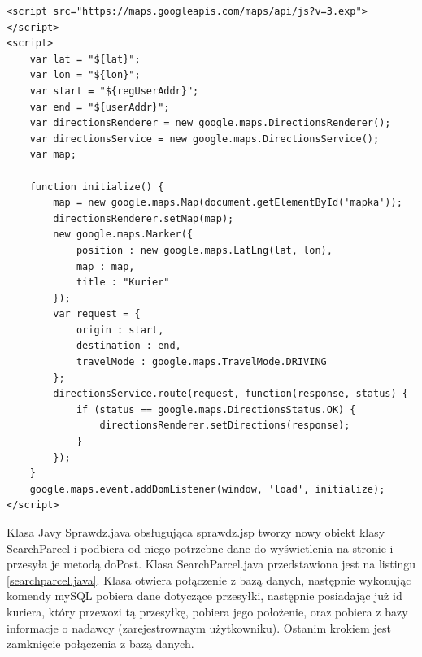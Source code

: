 \documentclass[eng,printmode,oneside]{mgr}
\begin{document}
\begin{lstlisting}[caption=Kody JavaScript'owy pobierający mapę z
serwera Google,label=mapsJS] 
<script src="https://maps.googleapis.com/maps/api/js?v=3.exp"></script> 
<script>
	var lat = "${lat}";
	var lon = "${lon}";
	var start = "${regUserAddr}";
	var end = "${userAddr}";
	var directionsRenderer = new google.maps.DirectionsRenderer();
	var directionsService = new google.maps.DirectionsService();
	var map;

	function initialize() {
		map = new google.maps.Map(document.getElementById('mapka'));
		directionsRenderer.setMap(map);
		new google.maps.Marker({
			position : new google.maps.LatLng(lat, lon),
			map : map,
			title : "Kurier"
		});
		var request = {
			origin : start,
			destination : end,
			travelMode : google.maps.TravelMode.DRIVING
		};
		directionsService.route(request, function(response, status) {
			if (status == google.maps.DirectionsStatus.OK) {
				directionsRenderer.setDirections(response);
			}
		});
	}
	google.maps.event.addDomListener(window, 'load', initialize);
</script>
\end{lstlisting}

Klasa Javy Sprawdz.java obsługująca sprawdz.jsp tworzy nowy obiekt klasy
SearchParcel i podbiera od niego potrzebne dane do wyświetlenia na stronie i
przesyła je metodą doPost. Klasa SearchParcel.java przedstawiona jest na
listingu \ref{searchparcel.java}. Klasa otwiera połączenie z bazą danych,
następnie wykonując komendy mySQL pobiera dane dotyczące przesyłki, następnie
posiadając już id kuriera, który przewozi tą przesyłkę, pobiera jego położenie,
oraz pobiera z bazy informacje o nadawcy (zarejestrownaym użytkowniku). Ostanim
krokiem jest zamknięcie połączenia z bazą danych.
\end{document}
